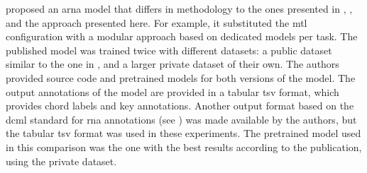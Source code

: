 
\textcite{mcleod2021modular} proposed an \gls{arna} model
that differs in methodology to the ones presented in
\textcite{chen2021attend}, \textcite{micchi2021deep}, and
the approach presented here. For example, it substituted the
\gls{mtl} configuration with a modular approach based on
dedicated models per task. The published model was trained
twice with different datasets: a public dataset similar to
the one in \textcite{micchi2021deep}, and a larger private
dataset of their own. The authors provided source code and
pretrained models for both versions of the model. The output
annotations of the model are provided in a tabular \gls{tsv}
format, which provides chord labels and key annotations.
Another output format based on the \gls{dcml} standard for
\gls{rna} annotations (see )
was made available by the authors, but the tabular \gls{tsv}
format was used in these experiments. The pretrained model
used in this comparison was the one with the best results
according to the publication, using the private dataset.
